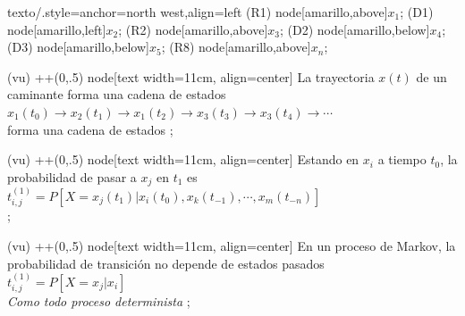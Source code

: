 \documentclass{beamer}
\begin{document}
\begin{zframe}{
  texto/.style={anchor=north west,align=left}}
(R1) node[amarillo,above]{$x_1$};
(D1) node[amarillo,left]{$x_2$};
(R2) node[amarillo,above]{$x_3$};
(D2) node[amarillo,below]{$x_4$};
(D3) node[amarillo,below]{$x_5$};
(R8) node[amarillo,above]{$x_n$};

(vu) ++(0,.5) node[text width=11cm, align=center]
{La trayectoria $x(t)$ de un caminante forma una cadena de estados\\[2mm] 
  $x_1(t_0)\rightarrow x_2(t_1)\rightarrow x_1(t_2)\rightarrow x_3(t_3)\rightarrow x_3(t_4)\rightarrow \cdots$\\[2mm] 
   forma una cadena de estados
};
 
(vu) ++(0,.5) node[text width=11cm, align=center]{
  Estando en $x_i$ a tiempo $t_0$, la probabilidad de pasar a $x_j$ en $t_1$ es\\[2mm] 
  ${t_{i,j}^{(1)}=P[X=x_j(t_1)|x_i(t_0),x_k(t_{-1}),\cdots,x_m(t_{-n})]}$\\[2mm]
};

(vu) ++(0,.5) node[text width=11cm, align=center]{
  En un proceso de Markov, la probabilidad de transición no depende de estados pasados\\[2mm]
  ${t_{i,j}^{(1)}=P[X=x_j|x_i]}$\\[2mm]
   \textit{Como todo proceso determinista}
};
 





                          
                          
\end{zframe}
          
\end{document}
